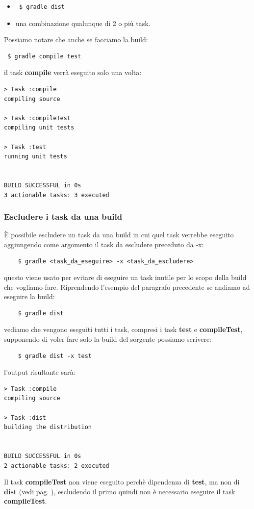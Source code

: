 \documentclass{article}
\begin{document}
\begin{flushleft}
\begin{itemize}
    \item \begin{verbatim} $ gradle dist \end{verbatim}
    \item una combinazione qualunque di 2 o più task.
\end{itemize}
Possiamo notare che anche se facciamo la build: \begin{verbatim} $ gradle compile test \end{verbatim} il task \textbf{compile} verrà eseguito solo una volta:
\begin{verbatim}
> Task :compile 
compiling source

> Task :compileTest 
compiling unit tests

> Task :test 
running unit tests


BUILD SUCCESSFUL in 0s
3 actionable tasks: 3 executed
\end{verbatim}
\subsubsection{Escludere i task da una build}
È possibile escludere un task da una build in cui quel task verrebbe eseguito aggiungendo come argomento il task da escludere preceduto da -x:
\begin{verbatim}
    $ gradle <task_da_eseguire> -x <task_da_escludere>
\end{verbatim}
questo viene usato per evitare di eseguire un task inutile per lo scopo della build che vogliamo fare. Riprendendo l'esempio del paragrafo precedente se andiamo ad eseguire la build:
\begin{verbatim}
    $ gradle dist    
\end{verbatim}
vediamo che vengono eseguiti tutti i task, compresi i task \textbf{test} e \textbf{compileTest}, supponendo di voler fare solo la build del sorgente possiamo scrivere:
\begin{verbatim}
    $ gradle dist -x test
\end{verbatim}
l'output risultante sarà:
\begin{verbatim}
> Task :compile 
compiling source

> Task :dist 
building the distribution


BUILD SUCCESSFUL in 0s
2 actionable tasks: 2 executed
\end{verbatim}
Il task \textbf{compileTest} non viene eseguito perchè dipendenza di \textbf{test}, ma non di \textbf{dist} (vedi pag. \pageref{taskdip}), escludendo il primo quindi non è necessario eseguire il task \textbf{compileTest}.


\end{flushleft}
\end{document}
